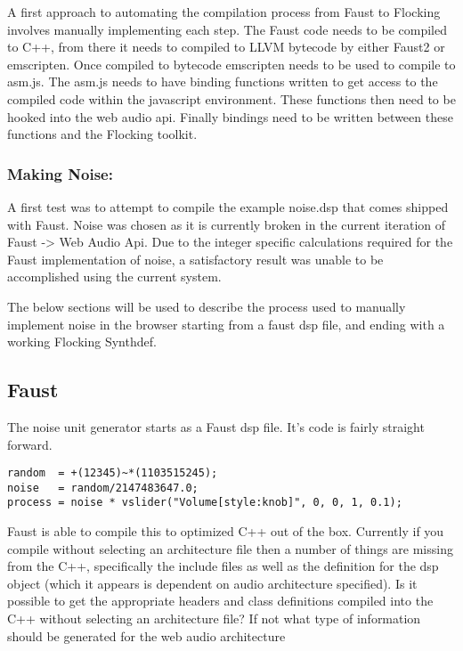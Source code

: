 \documentclass[runningheads,a4paper]{llncs}
\begin{document}
A first approach to automating the compilation process from Faust to Flocking involves manually implementing each step. The Faust code needs to be compiled to C++, from there it needs to compiled to LLVM bytecode by either Faust2 or emscripten.  Once compiled to bytecode emscripten needs to be used to compile to asm.js.  The asm.js needs to have binding functions written to get access to the compiled code within the javascript environment.  These functions then need to be hooked into the web audio api.  Finally bindings need to be written between these functions and the Flocking toolkit.

\subsubsection{Making Noise:}

A first test was to attempt to compile the example noise.dsp that comes shipped with Faust.  Noise was chosen as it is currently broken in the current iteration of Faust -> Web Audio Api.  Due to the integer specific calculations required for the Faust implementation of noise, a satisfactory result was unable to be accomplished using the current system.

The below sections will be used to describe the process used to manually implement noise in the browser starting from a faust dsp file, and ending with a working Flocking Synthdef.

\subsection{Faust}

The noise unit generator starts as a Faust dsp file.  It's code is fairly straight forward.

\begin{verbatim}
random  = +(12345)~*(1103515245);
noise   = random/2147483647.0;
process = noise * vslider("Volume[style:knob]", 0, 0, 1, 0.1);
\end{verbatim}

Faust is able to compile this to optimized C++ out of the box.  Currently if you compile without selecting an architecture file then a number of things are missing from the C++, specifically the include files as well as the definition for the dsp object (which it appears is dependent on audio architecture specified). Is it possible to get the appropriate headers and class definitions compiled into the C++ without selecting an architecture file?  If not what type of information should be generated for the web audio architecture
\end{document}
